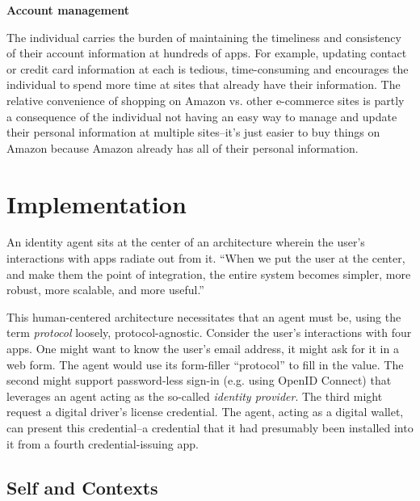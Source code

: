 \documentclass[11pt, oneside]{article}   	%
\begin{document}
\textbf{Account management} 

The individual carries the burden of maintaining the timeliness and consistency of their account information at hundreds of apps. For example, updating contact or credit card information at each is tedious, time-consuming and encourages the individual to spend more time at sites that already have their information. The relative convenience of shopping on Amazon vs. other e-commerce sites is partly a consequence of the individual not having an easy way to manage and update their personal information at multiple sites--it's just easier to buy things on Amazon because Amazon already has all of their personal information.


\section{Implementation} %

An identity agent sits at the center of an architecture wherein the user's interactions with apps radiate out from it. ``When we put the user at the center, and make them the point of integration, the entire system becomes simpler, more robust, more scalable, and more useful.''\cite{Andrieu2007}

This human-centered architecture necessitates that an agent must be, using the term \emph{protocol} loosely, protocol-agnostic. Consider the user's interactions with four apps. One might want to know the user's email address, it might ask for it in a web form. The agent would use its form-filler ``protocol'' to fill in the value. The second might support password-less sign-in (e.g. using OpenID Connect) that leverages an agent acting as the so-called \emph{identity provider}. The third might request a digital driver's license credential. The agent, acting as a digital wallet, can present this credential--a credential that it had presumably been installed into it from a fourth credential-issuing app. 

\subsection{Self and Contexts}
\end{document}
